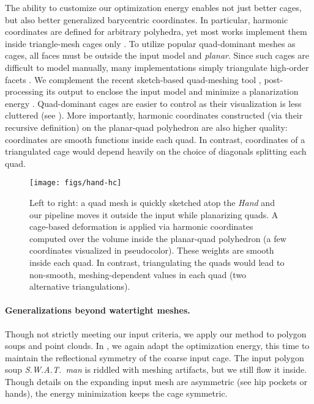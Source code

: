 The ability to customize our optimization energy enables not just better cages,
but also better generalized barycentric coordinates. In particular, harmonic
coordinates are defined for arbitrary polyhedra, yet most works implement them
inside triangle-mesh cages only \cite{HarmonicCoodinates07}.
%
To utilize popular quad-dominant meshes as cages, all faces must be outside the
input model and \emph{planar}.
%
Since such cages are difficult to model manually, many implementations simply
triangulate high-order facets \cite{HarmonicCoodinates07}.
%
We complement the recent sketch-based quad-meshing tool \cite{Takayama:2013},
post-processing its output to enclose the input model and minimize a
planarization energy \cite{poranne2013interactive}.
%
Quad-dominant cages are easier to control as their visualization is less
cluttered (see ).
%
More importantly, harmonic coordinates constructed (via their recursive
definition) on the planar-quad polyhedron are also higher quality: coordinates
are smooth functions inside each quad.
%
In contrast, coordinates of a triangulated cage would depend heavily on the
choice of diagonals splitting each quad.

\begin{figure}
  \texttt{[image: figs/hand-hc]}
  \caption{Left to right: a quad mesh is quickly sketched atop the \emph{Hand}
  and our pipeline moves it outside the input while planarizing quads. A
  cage-based deformation is applied via harmonic coordinates computed over the
  volume inside the planar-quad polyhedron (a few coordinates visualized in
  pseudocolor). These weights are smooth inside each quad. In contrast,
  triangulating the quads would lead to non-smooth, meshing-dependent values in
  each quad (two alternative triangulations).}
  \label{fig:hand-hc}
\end{figure}

\paragraph{Generalizations beyond watertight meshes.}
%
Though not strictly meeting our input criteria, we apply our method to
polygon soups and point clouds.
%
In , we again adapt the optimization energy, this time to
maintain the reflectional symmetry of the coarse input cage.
%
The input polygon soup \emph{S.W.A.T.\ man} is riddled with meshing artifacts,
but we still flow it inside.
%
Though details on the expanding input mesh are asymmetric (see hip pockets or
hands), the energy minimization keeps the cage symmetric.


